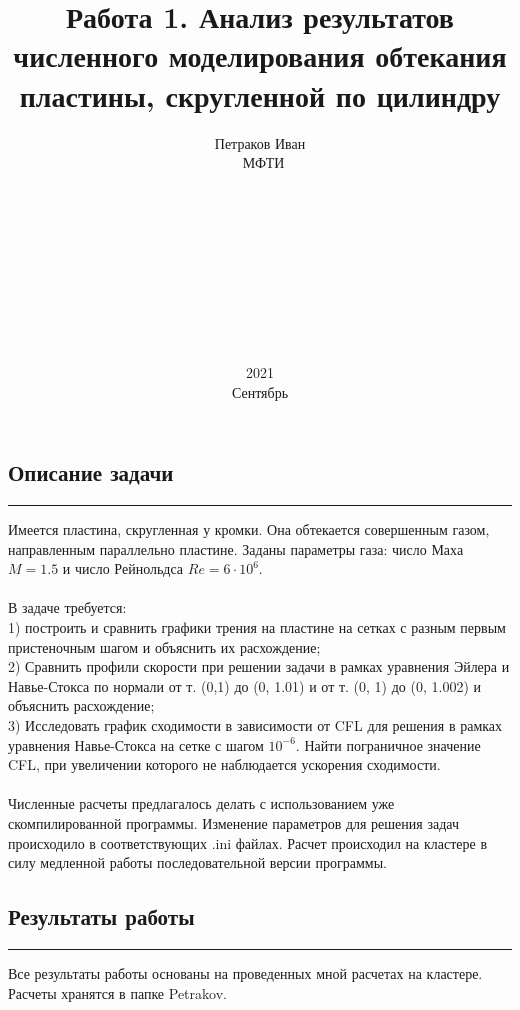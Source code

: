 \documentclass[12pt,a4paper, titlepage]{article}
\title{Работа 1. Анализ результатов численного моделирования обтекания пластины, скругленной по цилиндру}
\date{2021\\Сентябрь}
\author{Петраков Иван\\\ МФТИ\\\\\\\\\\\\\\\\\\\\}
\begin{document}
\maketitle

\subsection*{Описание задачи}
\noindent\rule{\textwidth}{1pt}
Имеется пластина, скругленная у кромки. Она обтекается совершенным газом, направленным параллельно пластине. Заданы параметры газа: число Маха $M = 1.5$ и число Рейнольдса $Re = 6 \cdot 10^6$.
\\
\\
В задаче требуется:
\\
1) построить и сравнить графики трения на пластине на сетках с разным первым пристеночным шагом и объяснить их расхождение;
\\
2) Сравнить профили скорости при решении задачи в рамках уравнения Эйлера и Навье-Стокса по нормали от т. (0,1) до (0, 1.01) и от т. (0, 1) до (0, 1.002) и объяснить расхождение;
\\
3) Исследовать график сходимости в зависимости от CFL для решения в рамках уравнения Навье-Стокса на сетке с шагом $10^{-6}$. Найти пограничное значение CFL, при увеличении которого не наблюдается ускорения сходимости.
\\
\\
Численные расчеты предлагалось делать с использованием уже скомпилированной программы. Изменение параметров для решения задач происходило в соответствующих .ini файлах. Расчет происходил на кластере в силу медленной работы последовательной версии программы.
\subsection*{Результаты работы}
\noindent\rule{\textwidth}{1pt}
Все результаты работы основаны на проведенных мной расчетах на кластере. Расчеты хранятся в папке Petrakov.
\\
\end{document}
